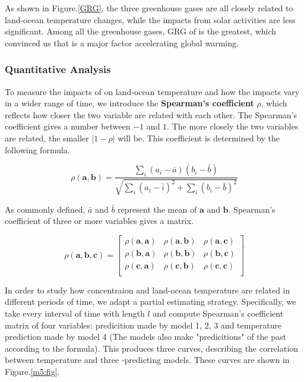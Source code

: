 \documentclass[12pt]{article}
\begin{document}
As shown in Figure.\ref{GRG}, the three greenhouse gases are all closely related to land-ocean temperature changes, while the impacts from solar activities are less significant. Among all the greenhouse gases, GRG of  is the greatest, which convinced us that  is a major factor accelerating global warming. 

\subsubsection{Quantitative Analysis}

To measure the impacts of  on land-ocean temperature and how the impacts vary in a wider range of time, we introduce the \textbf{Spearman's coefficient} $\rho$, which reflects how closer the two variable are related with each other. The Spearman's coefficient gives a number between $-1$ and $1$. The more closely the two variables are related, the smaller $|1 - \rho|$ will be. This coefficient is determined by the following formula. 

\begin{equation}
    \rho(\boldsymbol{a}, \boldsymbol{b}) = \frac{\sum\limits_i (a_i - \bar a)(b_i - \bar b) }{\sqrt{
        \sum\limits_i (a_i - \bar i)^2 + \sum\limits_i (b_i - \bar b)^2
    }}
\end{equation}

As commonly defined, $\bar a$ and $\bar b$ represent the mean of $\boldsymbol{a}$ and $\boldsymbol{b}$. Spearman's coefficient of three or more variables gives a matrix.

\begin{equation}
    \rho(\boldsymbol{a}, \boldsymbol{b}, \boldsymbol{c}) = 
    \begin{bmatrix}
        \rho(\boldsymbol{a}, \boldsymbol{a}) & \rho(\boldsymbol{a}, \boldsymbol{b}) & \rho(\boldsymbol{a}, \boldsymbol{c}) \\

        \rho(\boldsymbol{b}, \boldsymbol{a}) & \rho(\boldsymbol{b}, \boldsymbol{b}) & \rho(\boldsymbol{b}, \boldsymbol{c}) \\

        \rho(\boldsymbol{c}, \boldsymbol{a}) & \rho(\boldsymbol{c}, \boldsymbol{b}) & \rho(\boldsymbol{c}, \boldsymbol{c}) \\
    \end{bmatrix}
\end{equation}

In order to study how  concentraion and land-ocean temperature are related in different periods of time, we adapt a partial estimating strategy. Specifically, we take every interval of time with length $l$ and compute Spearman's coefficient matrix of four variables:  predicition made by model 1, 2, 3 and temperature prediction made by model 4 (The models also make "predicitions" of the past according to the formula). This produces three curves, describing the correlation between temperature and three -predicting models. These curves are shown in Figure.\ref{m5:fig}.
\end{document}
